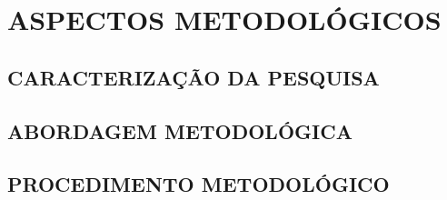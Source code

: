 \chapter{ASPECTOS METODOLÓGICOS}
\label{ch:aspectosmetodologicos}
\lipsum[1-1]
\section{CARACTERIZAÇÃO DA PESQUISA}
\label{sec:caracterizacaodapesquisa}
\lipsum[1-1]
\section{ABORDAGEM METODOLÓGICA}
\label{sec:abordagemmetodologica}
\lipsum[1-1]
\section{PROCEDIMENTO METODOLÓGICO}
\label{sec:procedimentometodologico}
\lipsum[1-6]